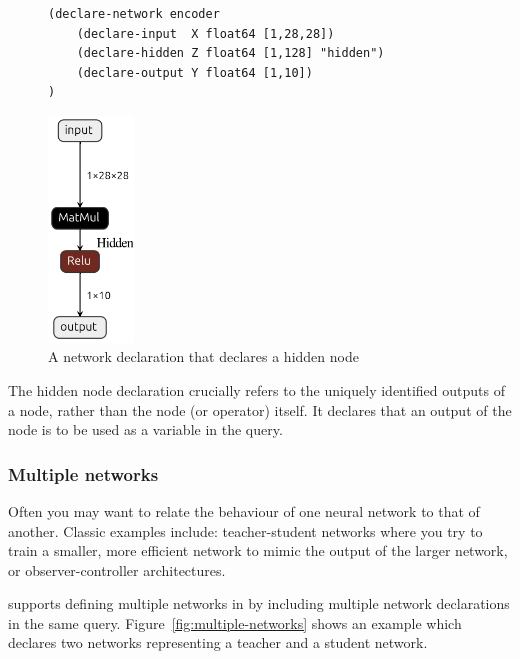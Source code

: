 \begin{figure}[h!]
    \begin{minipage}[c]{0.76\textwidth}
        \begin{lstlisting}[style=lbnf]   
(declare-network encoder
    (declare-input  X float64 [1,28,28])
    (declare-hidden Z float64 [1,128] "hidden")
    (declare-output Y float64 [1,10])
)\end{lstlisting}
    \end{minipage}%
    \begin{minipage}[c]{0.21\textwidth}
        \centering
        \includegraphics[height=6cm]{imgs/encoder_net.onnx.png}
    \end{minipage}
    \caption{A \vnnlib{} network declaration that declares a hidden node}
    \label{fig:hidden-node}
\end{figure}

The hidden node declaration crucially refers to the uniquely identified outputs of a node, rather than the node (or operator) itself. It declares that an output of the node is to be used as a variable in the \vnnlib{} query.

\subsubsection{Multiple networks}
\label{sec:multiple-network}

Often you may want to relate the behaviour of one neural network to that of another. Classic examples include: teacher-student networks where you try to train a smaller, more efficient network to mimic the output of the larger network, or observer-controller architectures.

\vnnlib{} supports defining multiple networks in by including multiple network declarations in the same query. Figure~\ref{fig:multiple-networks} 
shows an example which declares two networks representing a teacher and a student network.

